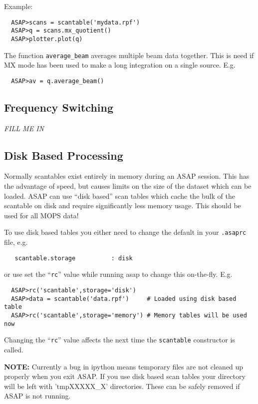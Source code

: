 \documentclass[11pt]{article}
\newcommand{\cmd}[1]{{\tt #1}}
\begin{document}
Example:

\begin{verbatim}
  ASAP>scans = scantable('mydata.rpf')
  ASAP>q = scans.mx_quotient()
  ASAP>plotter.plot(q)
\end{verbatim}

The function \cmd{average\_beam} averages multiple beam data
together. This is need if MX mode has been used to make a long
integration on a single source. E.g.

\begin{verbatim}
  ASAP>av = q.average_beam()
\end{verbatim}

\subsection{Frequency Switching}

{\em FILL ME IN}

\subsection{Disk Based Processing}

Normally scantables exist entirely in memory during an ASAP
session. This has the advantage of speed, but causes limits on the
size of the dataset which can be loaded. ASAP can use ``disk based''
scan tables which cache the bulk of the scantable on disk and require
significantly less memory usage. This should be used for all MOPS data!

To use disk based tables you either need to change the default in your
\cmd{.asaprc} file, e.g.
\begin{verbatim}
   scantable.storage          : disk
\end{verbatim}

or use set the ``\cmd{rc}'' value while running asap to change this
on-the-fly. E.g.
\begin{verbatim}
  ASAP>rc('scantable',storage='disk')
  ASAP>data = scantable('data.rpf')     # Loaded using disk based table
  ASAP>rc('scantable',storage='memory') # Memory tables will be used now
\end{verbatim}

Changing the ``\cmd{rc}'' value affects the next time the
\cmd{scantable} constructor is called.

{\bf NOTE: } Currently a bug in ipython means temporary files are not
cleaned up properly when you exit ASAP. If you use disk based scan
tables your directory will be left with 'tmpXXXXX\_X' directories. These can
be safely removed if ASAP is not running.
\end{document}
